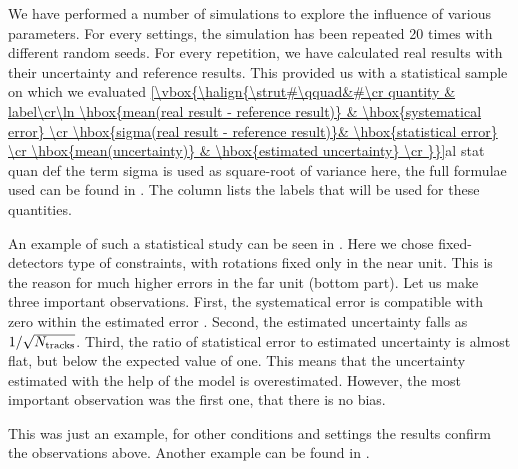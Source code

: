 
We have performed a number of simulations to explore the influence of various parameters. For every settings, the simulation has been repeated 20 times with different random seeds. For every repetition, we have calculated real results with their uncertainty and reference results. This provided us with a statistical sample on which we evaluated
\eqref{\vbox{\halign{\strut#\qquad&#\cr
quantity & label\cr\ln
\hbox{mean(real result - reference result)}	& \hbox{systematical error} \cr
\hbox{sigma(real result - reference result)}& \hbox{statistical error} \cr
\hbox{mean(uncertainty)} 					& \hbox{estimated uncertainty} \cr
}}}{al stat quan def}
the term sigma is used as square-root of variance here, the full formulae used can be found in . The \rhs{} column lists the labels that will be used for these quantities.

An example of such a statistical study can be seen in . Here we chose fixed-detectors type of constraints, with rotations fixed only in the near unit. This is the reason for much higher errors in the far unit (bottom part). Let us make three important observations. First, the systematical error is compatible with zero within the estimated error . Second, the estimated uncertainty falls as $1/\sqrt{N_{\rm tracks}}$. Third, the ratio of statistical error to estimated uncertainty is almost flat, but below the expected value of one. This means that the uncertainty estimated with the help of the model  is overestimated. However, the most important observation was the first one, that there is no bias.

This was just an example, for other conditions and settings the results confirm the observations above. Another example can be found in .


